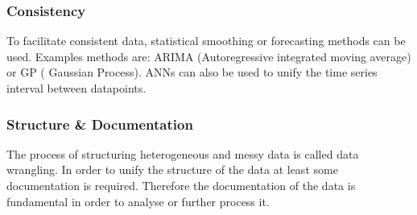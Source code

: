 \subsubsection{Consistency}
To facilitate consistent data, statistical smoothing or forecasting methods can be used. Examples methods are: ARIMA (Autoregressive integrated moving average) or GP ( Gaussian Process). ANNs can also be used to unify the time series interval between datapoints. \cite{songIoTDataQuality2020}

\subsubsection{Structure \& Documentation}
The process of structuring heterogeneous and messy data is called data wrangling. In order to unify the structure of the data at least some documentation is required. Therefore the documentation of the data is fundamental in order to analyse or further process it. 